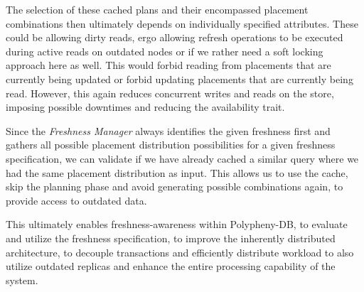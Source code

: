 The selection of these cached plans and their encompassed placement combinations then ultimately depends on individually specified attributes.
These could be allowing dirty reads, ergo allowing refresh operations to be executed during active reads on outdated nodes or if we rather need a soft 
locking approach here as well. This would forbid reading from placements that are currently being updated or forbid updating placements that are currently being read.
However, this again reduces concurrent writes and reads on the store, imposing possible downtimes and reducing the availability trait.

Since the \emph{Freshness Manager} always identifies the given freshness first and gathers all possible placement distribution possibilities for a given freshness specification, 
we can validate if we have already cached a similar query where we had the same placement distribution as input. 
This allows us to use the cache, skip the planning phase and avoid generating possible combinations again, to provide access to outdated data. 

This ultimately enables freshness-awareness within Polypheny-DB, to evaluate and utilize the freshness specification, to improve the inherently distributed 
architecture, to decouple transactions and efficiently distribute workload to also utilize outdated replicas and enhance the entire processing capability of the system.


